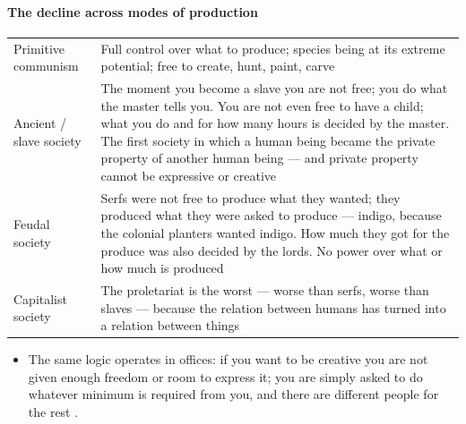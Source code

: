 \paragraph{The decline across modes of production}
\begin{table}[h!]
\centering
\begin{tabularx}{\textwidth}{lY}
\toprule
{}
 &  \\
\midrule
Primitive communism & Full control over what to produce; species being at its extreme potential; free to create, hunt, paint, carve \\
Ancient / slave society & The moment you become a slave you are not free; you do what the master tells you. You are not even free to have a child; what you do and for how many hours is decided by the master. The first society in which a human being became the private property of another human being --- and private property cannot be expressive or creative \\
Feudal society & Serfs were not free to produce what they wanted; they produced what they were asked to produce --- indigo, because the colonial planters wanted indigo. How much they got for the produce was also decided by the lords. No power over what or how much is produced \\
Capitalist society & The proletariat is the worst --- worse than serfs, worse than slaves --- because the relation between humans has turned into a relation between things \\
\bottomrule
\end{tabularx}
\end{table}

\begin{itemize}
    \item The same logic operates in offices: if you want to be creative you are not given enough freedom or room to express it; you are simply asked to do whatever minimum is required from you, and there are different people for the rest .
\end{itemize}

